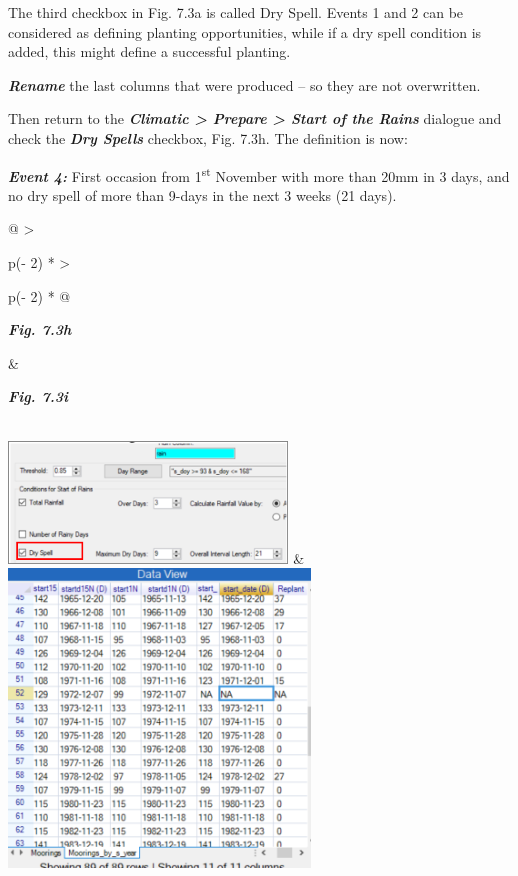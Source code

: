 \documentclass[
  letterpaper,
  DIV=11,
  numbers=noendperiod]{scrreprt}
\begin{document}
The third checkbox in Fig. 7.3a is called Dry Spell. Events 1 and 2 can
be considered as defining planting opportunities, while if a dry spell
condition is added, this might define a successful planting.

\textbf{\emph{Rename}} the last columns that were produced -- so they
are not overwritten.

Then return to the \textbf{\emph{Climatic \textgreater{} Prepare
\textgreater{} Start of the Rains}} dialogue and check the
\textbf{\emph{Dry Spells}} checkbox, Fig. 7.3h. The definition is now:

\textbf{\emph{Event 4:}} First occasion from 1\textsuperscript{st}
November with more than 20mm in 3 days, and no dry spell of more than
9-days in the next 3 weeks (21 days).

\begin{longtable}[]{@{}
  >{\raggedright\arraybackslash}p{(\columnwidth - 2\tabcolsep) * }
  >{\raggedright\arraybackslash}p{(\columnwidth - 2\tabcolsep) * }@{}}
\toprule\noalign{}
\begin{minipage}[b]{\linewidth}\raggedright
\textbf{\emph{Fig. 7.3h}}
\end{minipage} & \begin{minipage}[b]{\linewidth}\raggedright
\textbf{\emph{Fig. 7.3i}}
\end{minipage} \\
\midrule\noalign{}
\endhead
\bottomrule\noalign{}
\endlastfoot
\includegraphics[width=2.92363in,height=1.28105in]{figures/Fig7.3h.png}
&
\includegraphics[width=3.1585in,height=3.12056in]{figures/Fig7.3i.png} \\
\end{longtable}
\end{document}
